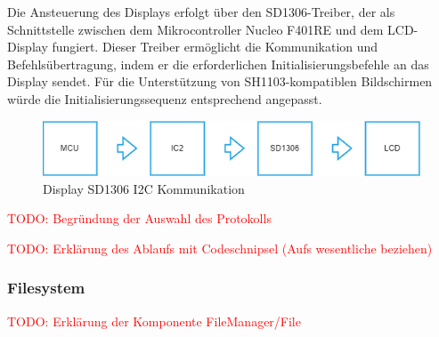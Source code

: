 Die Ansteuerung des Displays erfolgt über den SD1306-Treiber, der als Schnittstelle zwischen dem Mikrocontroller Nucleo F401RE und dem LCD-Display fungiert. Dieser Treiber ermöglicht die Kommunikation und Befehlsübertragung, indem er die erforderlichen Initialisierungsbefehle an das Display sendet. Für die Unterstützung von SH1103-kompatiblen Bildschirmen würde die Initialisierungssequenz entsprechend angepasst.


\begin{figure}[H]
	\centering
	\includegraphics[width=1.0\textwidth]{images/08_durchfuehrung/interface/Display SD1306 Treiber I2C.drawio}
	\caption{Display SD1306 I2C Kommunikation}
	\label{fig:Display SD1306 I2C}
\end{figure}

\newpage

\textcolor{red}{TODO: Begründung der Auswahl des Protokolls}

\textcolor{red}{TODO: Erklärung des Ablaufs mit Codeschnipsel (Aufs wesentliche beziehen)}



\subsubsection{Filesystem}

\textcolor{red}{TODO: Erklärung der Komponente FileManager/File}





